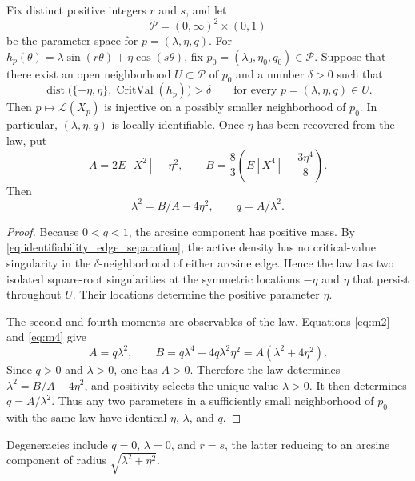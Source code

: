 \documentclass[11pt]{amsart}
\numberwithin{equation}{section}\setcounter{tocdepth}{3}\setcounter{secnumdepth}{3}
\begin{document}
\begin{proposition}\label{prop:identifiability}
Fix distinct positive integers $r$ and $s$, and let
\begin{equation}
 \mathcal P=(0,\infty)^2\times(0,1)
 \label{eq:identifiability_parameter_space}
\end{equation}
be the parameter space for $p=(\lambda,\eta,q)$.  For
$h_p(\theta)=\lambda\sin(r\theta)+\eta\cos(s\theta)$, fix
$p_0=(\lambda_0,\eta_0,q_0)\in\mathcal P$.  Suppose that there exist an open
neighborhood $U\subset\mathcal P$ of $p_0$ and a number $\delta>0$ such that
\begin{equation}
 \operatorname{dist}\bigl(\{-\eta,\eta\},\operatorname{CritVal}(h_p)\bigr)>\delta
 \qquad\text{for every }p=(\lambda,\eta,q)\in U.
 \label{eq:identifiability_edge_separation}
\end{equation}
Then $p\mapsto\mathcal L(X_p)$ is injective on a possibly smaller neighborhood of
$p_0$.  In particular, $(\lambda,\eta,q)$ is locally identifiable.  Once $\eta$ has
been recovered from the law, put
\begin{equation}
 A=2E[X^2]-\eta^2,
 \qquad
 B=\frac83\left(E[X^4]-\frac{3\eta^4}{8}\right).
 \label{eq:identifiability_observables}
\end{equation}
Then
\begin{equation}\lambda^2=B/A-4\eta^2,\qquad q=A/\lambda^2.\label{eq:moment_identification}\end{equation}
\end{proposition}
\begin{proof}
Because $0<q<1$, the arcsine component has positive mass.  By
\eqref{eq:identifiability_edge_separation}, the active density has no critical-value
singularity in the $\delta$-neighborhood of either arcsine edge.  Hence the law has two
isolated square-root singularities at the symmetric locations $-\eta$ and $\eta$ that
persist throughout $U$.  Their locations determine the positive parameter $\eta$.

The second and fourth moments are observables of the law.  Equations \eqref{eq:m2} and
\eqref{eq:m4} give
\begin{equation}
 A=q\lambda^2,
 \qquad
 B=q\lambda^4+4q\lambda^2\eta^2
   =A(\lambda^2+4\eta^2).
 \label{eq:identifiability_AB}
\end{equation}
Since $q>0$ and $\lambda>0$, one has $A>0$.  Therefore the law determines
$\lambda^2=B/A-4\eta^2$, and positivity selects the unique value $\lambda>0$.
It then determines $q=A/\lambda^2$.  Thus any two parameters in a sufficiently small
neighborhood of $p_0$ with the same law have identical $\eta$, $\lambda$, and $q$.
\end{proof}
Degeneracies include $q=0$, $\lambda=0$, and $r=s$, the latter reducing to an arcsine
component of radius $\sqrt{\lambda^2+\eta^2}$.
\end{document}
